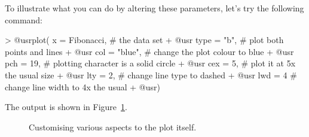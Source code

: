 To illustrate what you can do by altering these parameters, let's try the following command:
\begin{rblock1}
> @usr{plot( x = Fibonacci,}   # the data set
+ @usr{      type = "b",}      # plot both points and lines
+ @usr{      col = "blue",}    # change the plot colour to blue
+ @usr{      pch = 19,}        # plotting character is a solid circle
+ @usr{      cex = 5,}         # plot it at 5x the usual size
+ @usr{      lty = 2,}         # change line type to dashed
+ @usr{      lwd = 4}          # change line width to 4x the usual
+ @usr{)}
\end{rblock1}
The output is shown in Figure~\ref{fig:fifthplot}.


\begin{figure}[t]
\begin{center}
\caption{Customising various aspects to the plot itself.}
\HR
\label{fig:fifthplot}
\end{center}
\end{figure}




